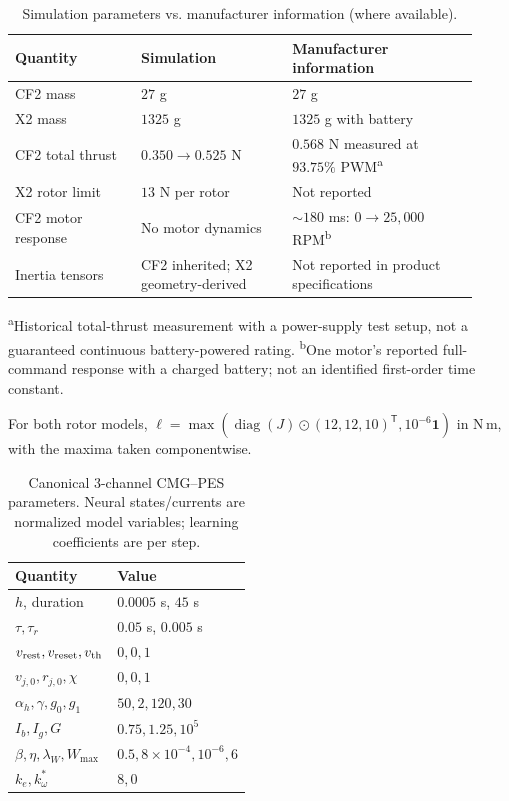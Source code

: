 \documentclass[letterpaper, 10 pt, conference]{ieeeconf}
\newcommand{\T}{^{\mathsf T}}
\begin{document}
\begin{table}[t]
\centering
\caption{Simulation parameters vs. manufacturer information (where available).}
\label{tab:manufacturer}
\setlength{\tabcolsep}{3pt}
\footnotesize
\begin{tabular}{@{}>{\raggedright\arraybackslash}p{0.25\linewidth}>{\raggedright\arraybackslash}p{0.30\linewidth}>{\raggedright\arraybackslash}p{0.37\linewidth}@{}}
\toprule
Quantity & Simulation & Manufacturer information\\
\midrule
CF2 mass & $27$ g & $27$ g \cite{bitcrazeCF20Specs}\\
X2 mass & $1325$ g & $1325$ g with battery \cite{skydioX2ESpecs}\\
CF2 total thrust & $0.350\to0.525$ N & $0.568$ N measured at $93.75\%$ PWM\textsuperscript{a} \cite{bitcrazeThrustMeasurements}\\
X2 rotor limit & $13$ N per rotor & Not reported \cite{skydioX2ESpecs}\\
CF2 motor response & No motor dynamics & $\sim180$ ms: $0\to25{,}000$ RPM\textsuperscript{b} \cite{bitcrazeMotorResponse}\\
Inertia tensors & CF2 inherited; X2 geometry-derived & Not reported in product specifications \cite{bitcrazeCF20Specs,skydioX2ESpecs}\\
\bottomrule
\end{tabular}
\par\smallskip
\begin{minipage}{0.97\linewidth}
\scriptsize
\textsuperscript{a}Historical total-thrust measurement with a power-supply test setup, not a guaranteed continuous battery-powered rating.
\textsuperscript{b}One motor's reported full-command response with a charged battery; not an identified first-order time constant.
\end{minipage}
\end{table}

For both rotor models,
$\bm\ell=\max(\operatorname{diag}(J)\odot(12,12,10)\T,10^{-6}\bm1)$
in N\,m, with the maxima taken componentwise.



\begin{table}[t]
\caption{Canonical 3-channel CMG--PES parameters. Neural states/currents
are normalized model variables; learning coefficients are per step.}
\label{tab:parameters}\centering\small
\begin{tabular}{ll}
\toprule
Quantity & Value\\\midrule
$h$, duration & $0.0005$ s, $45$ s\\
$\tau,\tau_r$ & $0.05$ s, $0.005$ s\\
$v_{\rm rest},v_{\rm reset},v_{\rm th}$ & $0,0,1$\\
$v_{j,0},r_{j,0},\chi$ & $0,0,1$\\
$\alpha_h,\gamma,g_0,g_1$ & $50,2,120,30$\\
$I_b,I_g,G$ & $0.75,1.25,10^5$\\
$\beta,\eta,\lambda_W,W_{\max}$ & $0.5,8\times10^{-4},10^{-6},6$\\
$k_e,k_\omega^*$ & $8,0$\\
\bottomrule
\end{tabular}
\end{table}
\end{document}
